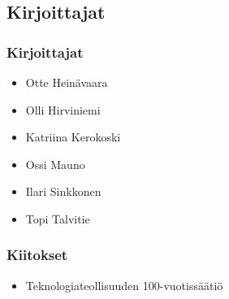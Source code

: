 \subsection*{Kirjoittajat}

\subsubsection*{Kirjoittajat}

\begin{itemize}
 \item Otte Heinävaara
 \item Olli Hirviniemi
 \item Katriina Kerokoski
 \item Ossi Mauno
 \item Ilari Sinkkonen
 \item Topi Talvitie
\end{itemize}

\subsubsection*{Kiitokset}

\begin{itemize}
 \item Teknologiateollisuuden 100-vuotissäätiö
\end{itemize}
 
